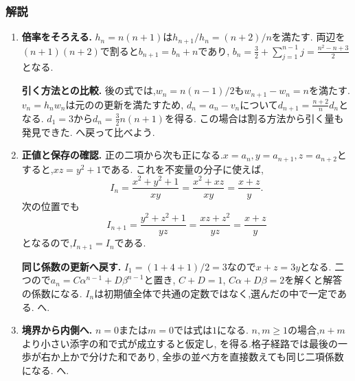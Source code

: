   \subsubsection{解説}
  \begin{enumerate}[label=\textbf{問\arabic*.},format=\bookitemlink{practice-connections}{solution}{problem}]
    \item \textbf{倍率をそろえる.}
      $h_n=n(n+1)$は$h_{n+1}/h_n=(n+2)/n$を満たす.
      両辺を$(n+1)(n+2)$で割ると$b_{n+1}=b_n+n$であり,
      $b_n=\frac32+\sum_{j=1}^{n-1}j=\frac{n^2-n+3}{2}$となる.
      \par\smallskip\textbf{引く方法との比較.}
      後の式では,$w_n=n(n-1)/2$も$w_{n+1}-w_n=n$を満たす.
      $v_n=h_nw_n$は元のの更新を満たすため,
      $d_n=a_n-v_n$について$d_{n+1}=\frac{n+2}{n}d_n$となる.
      $d_1=3$から$d_n=\frac32n(n+1)$を得る.
      この場合は割る方法から引く量も発見できた.
      へ戻って比べよう.
    \item \textbf{正値と保存の確認.}
      正の二項から次も正になる.$x=a_n,y=a_{n+1},z=a_{n+2}$とすると,$xz=y^2+1$である.
      これを不変量の分子に使えば,
      \[
        I_n=\frac{x^2+y^2+1}{xy}
           =\frac{x^2+xz}{xy}=\frac{x+z}{y}.
      \]
      次の位置でも
      \[
        I_{n+1}=\frac{y^2+z^2+1}{yz}
               =\frac{xz+z^2}{yz}=\frac{x+z}{y}
      \]
      となるので,$I_{n+1}=I_n$である.
      \par\smallskip\textbf{同じ係数の更新へ戻す.}
      $I_1=(1+4+1)/2=3$なので$x+z=3y$となる.
      二つので$a_n=C\alpha^{n-1}+D\beta^{n-1}$と置き,
      $C+D=1$, $C\alpha+D\beta=2$を解くと解答の係数になる.
      $I_n$は初期値全体で共通の定数ではなく,選んだの中で一定である.
      へ.
    \item \textbf{境界から内側へ.}
      $n=0$または$m=0$では式は$1$になる.
      $n,m\ge1$の場合,$n+m$より小さい添字の和で式が成立すると仮定し,
      \BookMathLayout{\[
        A_{n,m}=\binom{n+m-1}{m}+\binom{n+m-1}{m-1}
               =\binom{n+m}{m}
      \]}{\[
    \begin{aligned}
      A_{n,m}&=\binom{n+m-1}{m}+\binom{n+m-1}{m-1}\\
      &=\binom{n+m}{m}
    \end{aligned}
  \]}
      を得る.格子経路では最後の一歩が右か上かで分けた和であり,
      全歩の並べ方を直接数えても同じ二項係数になる.
      へ.

\end{enumerate}
